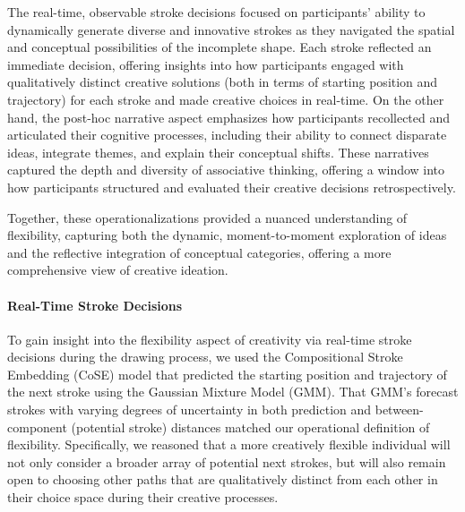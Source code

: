 \documentclass[../MA_Thesis.tex]{subfiles}
\begin{document}
The real-time, observable stroke decisions focused on participants’ ability to dynamically generate diverse and innovative strokes as they navigated the spatial and conceptual possibilities of the incomplete shape. Each stroke reflected an immediate decision, offering insights into how participants engaged with qualitatively distinct creative solutions (both in terms of starting position and trajectory) for each stroke and made creative choices in real-time. On the other hand, the post-hoc narrative aspect emphasizes how participants recollected and articulated their cognitive processes, including their ability to connect disparate ideas, integrate themes, and explain their conceptual shifts. These narratives captured the depth and diversity of associative thinking, offering a window into how participants structured and evaluated their creative decisions retrospectively.

Together, these operationalizations provided a nuanced understanding of flexibility, capturing both the dynamic, moment-to-moment exploration of ideas and the reflective integration of conceptual categories, offering a more comprehensive view of creative ideation.

\paragraph*{Real-Time Stroke Decisions}
To gain insight into the flexibility aspect of creativity via real-time stroke decisions during the drawing process, we used the Compositional Stroke Embedding (CoSE) model that predicted the starting position and trajectory of the next stroke using the Gaussian Mixture Model (GMM). That GMM's forecast strokes with varying degrees of uncertainty in both prediction and between-component (potential stroke) distances matched our operational definition of flexibility. Specifically, we reasoned that a more creatively flexible individual will not only consider a broader array of potential next strokes, but will also remain open to choosing other paths that are qualitatively distinct from each other in their choice space during their creative processes.
\end{document}
